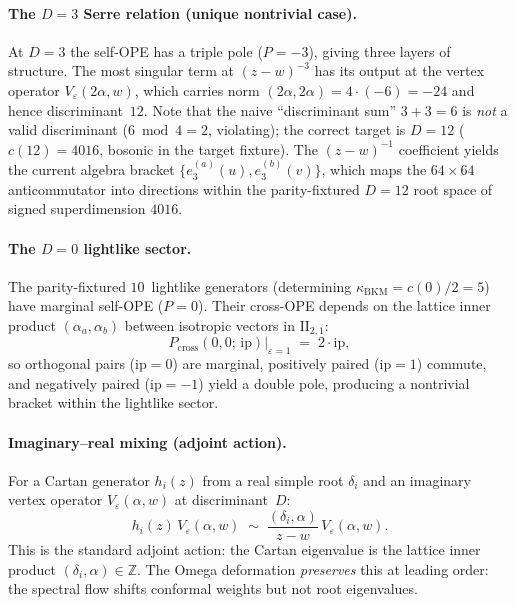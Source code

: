 \paragraph{The \texorpdfstring{$D = 3$}{D = 3} Serre relation (unique nontrivial case).}
At $D = 3$ the self-OPE has a triple pole ($P = -3$), giving three layers of structure.
The most singular term at $(z-w)^{-3}$ has its output at the vertex operator
$V_\varepsilon(2\alpha, w)$, which carries norm $(2\alpha, 2\alpha) = 4 \cdot (-6) = -24$
and hence discriminant~$12$. Note that the naive ``discriminant sum'' $3 + 3 = 6$ is
\emph{not} a valid discriminant ($6 \bmod 4 = 2$, violating); the correct target
is $D = 12$ ($c(12) = 4016$, bosonic in the target fixture). The $(z-w)^{-1}$ coefficient yields the
current algebra bracket $\{e_3^{(a)}(u), e_3^{(b)}(v)\}$, which maps the
$64 \times 64$ anticommutator into directions within the parity-fixtured
$D = 12$ root space of signed superdimension $4016$.

\paragraph{The \texorpdfstring{$D = 0$}{D = 0} lightlike sector.}
The parity-fixtured $10$~lightlike generators (determining $\kappa_{\mathrm{BKM}} = c(0)/2 = 5$)
have marginal self-OPE ($P = 0$). Their cross-OPE depends on the lattice inner
product $(\alpha_a, \alpha_b)$ between isotropic vectors in $\mathrm{II}_{2,1}$:
\[
P_{\mathrm{cross}}(0, 0;\, \mathrm{ip})\big|_{\varepsilon = 1}
\;=\; 2 \cdot \mathrm{ip},
\]
so orthogonal pairs ($\mathrm{ip} = 0$) are marginal, positively paired ($\mathrm{ip} = 1$)
commute, and negatively paired ($\mathrm{ip} = -1$) yield a double pole, producing a
nontrivial bracket within the lightlike sector.

\paragraph{Imaginary--real mixing (adjoint action).}
For a Cartan generator $h_i(z)$ from a real simple root $\delta_i$ and an imaginary
vertex operator $V_\varepsilon(\alpha, w)$ at discriminant~$D$:
\[
h_i(z)\, V_\varepsilon(\alpha, w)
\;\sim\; \frac{(\delta_i, \alpha)}{z - w}\, V_\varepsilon(\alpha, w).
\]
This is the standard adjoint action: the Cartan eigenvalue is the lattice inner product
$(\delta_i, \alpha) \in \mathbb{Z}$. The Omega deformation \emph{preserves} this at
leading order: the spectral flow shifts conformal weights but not root eigenvalues.

